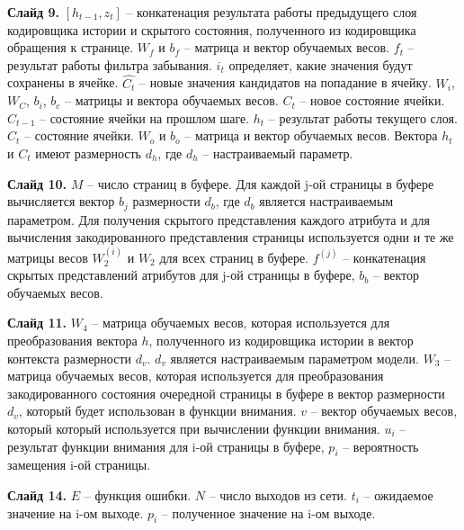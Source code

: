\begin{appendices}
	\textbf{Слайд 9.}
	$[h_{t-1}, z_t]$ -- конкатенация результата работы предыдущего слоя кодировщика истории и скрытого состояния, полученного из кодировщика обращения к странице. $W_f$ и $b_f$ -- матрица и вектор обучаемых весов. $f_t$ -- результат работы фильтра забывания. $i_t$ определяет, какие значения будут сохранены в ячейке. $\hat{C_t}$ -- новые значения кандидатов на попадание в ячейку. $W_i$, $W_C$, $b_i$, $b_c$ -- матрицы и вектора обучаемых весов. $C_t$ -- новое состояние ячейки. $C_{t-1}$ -- состояние ячейки на прошлом шаге. $h_t$ -- результат работы текущего слоя. $C_t$ -- состояние ячейки. $W_o$ и $b_o$ -- матрица и вектор обучаемых весов. Вектора $h_t$ и $C_t$ имеют размерность $d_h$, где $d_h$ -- настраиваемый параметр.
	
	\textbf{Слайд 10.}
	$M$ -- число страниц в буфере. Для каждой j-ой страницы в буфере вычисляется вектор $b_j$ размерности $d_b$, где	$d_b$ является настраиваемым параметром. Для получения скрытого представления каждого атрибута и для вычисления закодированного представления страницы используется одни и те же матрицы весов $W_2^{(i)}$ и $W_2$ для всех страниц в буфере. $f^{(j)}$ -- конкатенация скрытых представлений атрибутов для j-ой страницы в буфере, $b_b$ -- вектор обучаемых весов.
	
	\textbf{Слайд 11.}
	$W_4$ -- матрица обучаемых весов, которая используется для преобразования вектора $h$, полученного из кодировщика истории в вектор контекста размерности $d_v$. $d_v$ является настраиваемым параметром модели.	$W_3$ -- матрица обучаемых весов, которая используется для преобразования закодированного состояния очередной страницы в буфере в вектор размерности $d_v$, который будет использован в функции внимания.
	$v$ -- вектор обучаемых весов, который который используется при вычислении функции внимания. $u_i$ -- результат функции внимания для i-ой страницы в буфере, $p_i$ -- вероятность замещения i-ой страницы.
	
	\textbf{Слайд 14.}
	$E$ -- функция ошибки. $N$ -- число выходов из сети. $t_i$ -- ожидаемое значение на i-ом выходе. $p_i$ -- полученное значение на i-ом выходе.
	
	
\end{appendices}